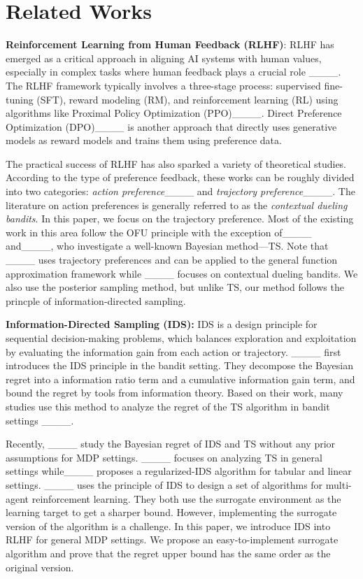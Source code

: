 \section{Related Works}
\textbf{Reinforcement Learning from Human Feedback (RLHF)}: RLHF has emerged as a critical approach in aligning AI systems with human values, especially in complex tasks where human feedback plays a crucial role ____. The RLHF framework typically involves a three-stage process: supervised fine-tuning (SFT), reward modeling (RM), and reinforcement learning (RL) using algorithms like Proximal Policy Optimization (PPO)____.
Direct Preference Optimization (DPO)____  is another approach that directly uses generative models as reward models and trains them using preference data. 

The practical success of RLHF has also sparked a variety of theoretical studies. According to the type of preference feedback, these works can be roughly divided into two categories: \emph{action preference}____ and \emph{trajectory preference}____. The literature  on action preferences is generally referred to as the \emph{contextual dueling bandits}.
In this paper, we focus on the trajectory preference. Most of the existing work in this area follow the OFU principle 
with the exception of____ and____, who investigate a well-known Bayesian method—TS. Note that ____ uses trajectory preferences and can be applied to the general function approximation framework while ____ focuses on contextual dueling bandits. We also use the posterior sampling method, but unlike TS, our method follows the princple of  information-directed sampling.

\textbf{Information-Directed Sampling (IDS):} IDS is a design principle for sequential decision-making problems, which balances
exploration and exploitation by evaluating the information gain from each action or trajectory. ____ first introduces the IDS principle in the bandit setting. They decompose the Bayesian regret into a information ratio term and a cumulative information gain term, and bound the regret by tools from information theory. Based on their work, many studies use this method to analyze the regret of the TS algorithm in bandit settings ____. 

Recently,  ____ study the Bayesian regret of IDS and TS without any prior assumptions for MDP settings. ____ focuses on analyzing TS in general settings while____ proposes a regularized-IDS algorithm for tabular and linear settings. ____ uses the principle of IDS to design a   set of algorithms for multi-agent reinforcement learning.
They both use the surrogate environment as the learning target to get a sharper bound. However,  implementing the surrogate version of the algorithm is a  challenge. In this paper, we introduce IDS into RLHF for general MDP settings. We propose an easy-to-implement surrogate algorithm and prove that the regret upper bound has the same order as the original version.